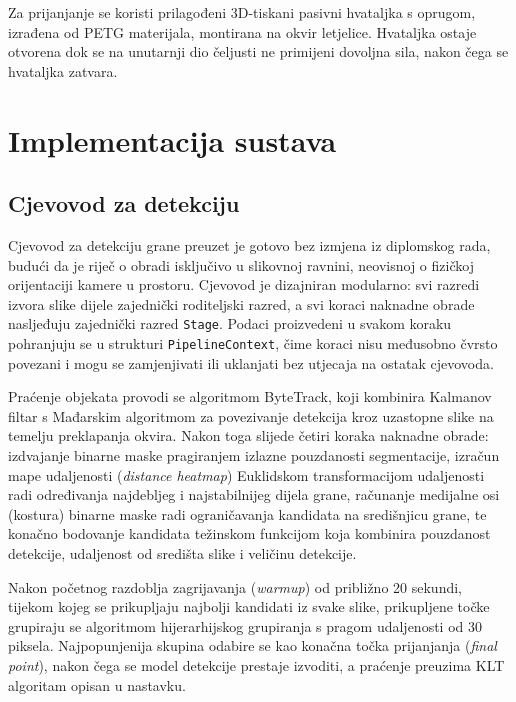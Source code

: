 Za prijanjanje se koristi prilagođeni 3D-tiskani pasivni hvataljka s oprugom, izrađena od PETG materijala, montirana na okvir letjelice. Hvataljka ostaje otvorena dok se na unutarnji dio čeljusti ne primijeni dovoljna sila, nakon čega se hvataljka zatvara.

\section{Implementacija sustava}
\label{sec:implementacija}

\subsection{Cjevovod za detekciju}
\label{subsec:cjevovod}

Cjevovod za detekciju grane preuzet je gotovo bez izmjena iz diplomskog rada, budući da je riječ o obradi isključivo u slikovnoj ravnini, neovisnoj o fizičkoj orijentaciji kamere u prostoru. Cjevovod je dizajniran modularno: svi razredi izvora slike dijele zajednički roditeljski razred, a svi koraci naknadne obrade nasljeđuju zajednički razred \texttt{Stage}. Podaci proizvedeni u svakom koraku pohranjuju se u strukturi \texttt{PipelineContext}, čime koraci nisu međusobno čvrsto povezani i mogu se zamjenjivati ili uklanjati bez utjecaja na ostatak cjevovoda.

Praćenje objekata provodi se algoritmom ByteTrack, koji kombinira Kalmanov filtar s Mađarskim algoritmom za povezivanje detekcija kroz uzastopne slike na temelju preklapanja okvira. Nakon toga slijede četiri koraka naknadne obrade: izdvajanje binarne maske pragiranjem izlazne pouzdanosti segmentacije, izračun mape udaljenosti (\emph{distance heatmap}) Euklidskom transformacijom udaljenosti radi određivanja najdebljeg i najstabilnijeg dijela grane, računanje medijalne osi (kostura) binarne maske radi ograničavanja kandidata na središnjicu grane, te konačno bodovanje kandidata težinskom funkcijom koja kombinira pouzdanost detekcije, udaljenost od središta slike i veličinu detekcije.

Nakon početnog razdoblja zagrijavanja (\emph{warmup}) od približno 20 sekundi, tijekom kojeg se prikupljaju najbolji kandidati iz svake slike, prikupljene točke grupiraju se algoritmom hijerarhijskog grupiranja s pragom udaljenosti od 30 piksela. Najpopunjenija skupina odabire se kao konačna točka prijanjanja (\emph{final point}), nakon čega se model detekcije prestaje izvoditi, a praćenje preuzima KLT algoritam opisan u nastavku.

